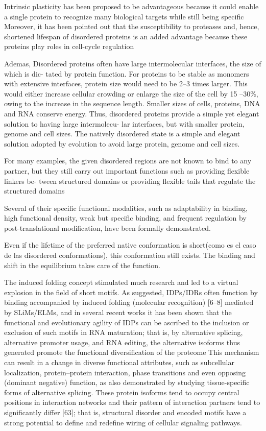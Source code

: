 Intrinsic plasticity has been proposed to be advantageous because it could enable a single protein to recognize many biological targets while still being specific
Moreover, it has been pointed out that the susceptibility to proteases and, hence,
shortened lifespan of disordered proteins is an added advantage because these proteins play roles in cell-cycle
regulation


Ademas, Disordered proteins often have
large intermolecular interfaces, the size of which is dic-
tated by protein function. For proteins to be stable as
monomers with extensive interfaces, protein size
would need to be 2–3 times larger. This would either
increase cellular crowding or enlarge the size of the cell
by 15 –30\%, owing to the increase in the sequence
length. Smaller sizes of cells, proteins, DNA and RNA
conserve energy. Thus, disordered proteins provide a
simple yet elegant solution to having large intermolecu-
lar interfaces, but with smaller protein, genome and
cell sizes.
The natively disordered state is a simple
and elegant solution adopted by evolution to avoid large
protein, genome and cell sizes.

For many examples, the given disordered regions are not known to bind to any partner, but they still carry out
important functions such as providing flexible linkers be-
tween structured domains or providing flexible tails that
regulate the structured domains

Several of their specific functional modalities, such as adaptability in binding, high functional density, weak but specific binding, and frequent regulation by post-translational modification, have been formally demonstrated. 


Even if the lifetime of the preferred native
conformation is short(como es el caso de las disordered conformations), this conformation still exists. The
binding and shift in the equilibrium takes care of
the function.


The induced folding concept stimulated much research and led to a virtual explosion in the field of short motifs.
As suggested, IDPs/IDRs often function by binding accompanied by induced folding (molecular recognition) [6–8] mediated by SLiMs/ELMs, and in several recent
works it has been shown that the functional and evolutionary agility of IDPs can be ascribed to the inclusion or exclusion of such motifs in RNA maturation; that is, by alternative splicing, alternative promoter usage, and RNA
editing, the alternative isoforms thus generated promote the functional diversification of the proteome
This mechanism can result in a change in diverse functional attributes, such as subcellular localization, protein–protein interaction, phase transitions and even opposing (dominant negative) function, as also demonstrated by
studying tissue-specific forms of alternative splicing. These protein isoforms tend to occupy central positions in interaction networks and their pattern of interaction partners tend to significantly differ [63]; that is, structural disorder
and encoded motifs have a strong potential to define and redefine wiring of cellular signaling pathways.





